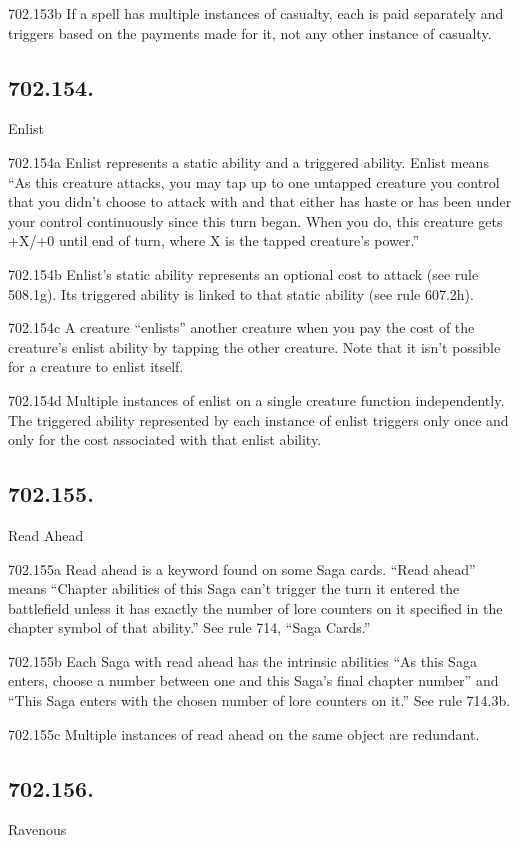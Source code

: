 702.153b If a spell has multiple instances of casualty, each is paid separately and triggers based on the payments made for it, not any other instance of casualty.

\subsection*{702.154.}
Enlist

702.154a Enlist represents a static ability and a triggered ability. Enlist means “As this creature attacks, you may tap up to one untapped creature you control that you didn’t choose to attack with and that either has haste or has been under your control continuously since this turn began. When you do, this creature gets +X/+0 until end of turn, where X is the tapped creature’s power.”

702.154b Enlist’s static ability represents an optional cost to attack (see rule 508.1g). Its triggered ability is linked to that static ability (see rule 607.2h).

702.154c A creature “enlists” another creature when you pay the cost of the creature’s enlist ability by tapping the other creature. Note that it isn’t possible for a creature to enlist itself.

702.154d Multiple instances of enlist on a single creature function independently. The triggered ability represented by each instance of enlist triggers only once and only for the cost associated with that enlist ability.

\subsection*{702.155.}
Read Ahead

702.155a Read ahead is a keyword found on some Saga cards. “Read ahead” means “Chapter abilities of this Saga can’t trigger the turn it entered the battlefield unless it has exactly the number of lore counters on it specified in the chapter symbol of that ability.” See rule 714, “Saga Cards.”

702.155b Each Saga with read ahead has the intrinsic abilities “As this Saga enters, choose a number between one and this Saga’s final chapter number” and “This Saga enters with the chosen number of lore counters on it.” See rule 714.3b.

702.155c Multiple instances of read ahead on the same object are redundant.

\subsection*{702.156.}
Ravenous

